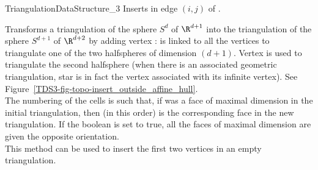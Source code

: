 \begin{ccRefConcept}{TriangulationDataStructure_3}
{Inserts  in edge $(i,j)$ of .
}

{Transforms a triangulation of the sphere $S^d$ of $\R^{d+1}$ into the
triangulation of the sphere $S^{d+1}$ of $\R^{d+2}$ by adding vertex :  
 is linked to all the vertices to triangulate one of the two
halfspheres of dimension $(d+1)$. Vertex  is used to
triangulate the second halfsphere (when there is an associated
geometric triangulation, star is in fact the vertex associated with
its infinite vertex). See
Figure~\ref{TDS3-fig-topo-insert_outside_affine_hull}.\\  
The numbering of the cells is such that, if  was a face of
maximal dimension in the initial triangulation, then  (in
this order) is the corresponding face in the new triangulation. If the
boolean  is set to true, all the faces of maximal
dimension are given the opposite orientation.\\
This method can be used to insert the first two vertices in an empty
triangulation.
} 


\end{ccRefConcept}
